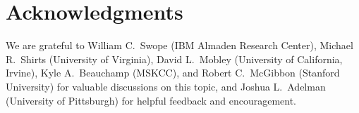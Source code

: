 \documentclass[aps,pre,twocolumn,nofootinbib,superscriptaddress,linenumbers,11point]{revtex4-1}
\begin{document}

\section*{Acknowledgments}

We are grateful to William C.~Swope (IBM Almaden Research Center), Michael R.~Shirts (University of Virginia), David L.~Mobley (University of California, Irvine), Kyle A.~Beauchamp (MSKCC), and Robert C.~McGibbon (Stanford University) for valuable discussions on this topic, and Joshua L.~Adelman (University of Pittsburgh) for helpful feedback and encouragement.


 

\end{document}
